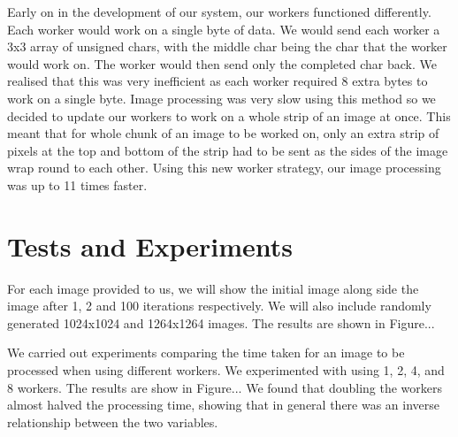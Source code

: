 \documentclass{article}
\begin{document}
\begin{multicols}{2}
\vspace{5mm}

Early on in the development of our system, our workers functioned differently. Each worker would work
on a single byte of data. We would send each worker a 3x3 array of unsigned chars, with the middle 
char being the char that the worker would work on. The worker would then send only the completed
char back. We realised that this was very inefficient as each worker required 8 extra bytes to work
on a single byte. Image processing was very slow using this method so we decided to update
our workers to work on a whole strip of an image at once. This meant that for whole chunk of an image
to be worked on, only an extra strip of pixels at the top and bottom of the strip had to be sent as
the sides of the image wrap round to each other. Using this new worker strategy, our image processing
was up to 11 times faster.

\section{Tests and Experiments}
For each image provided to us, we will show the initial image along side the image after 1, 2 and 100
iterations respectively. We will also include randomly generated 1024x1024 and 1264x1264 images. The
results are shown in Figure...

We carried out experiments comparing the time taken for an image to be processed when using different
workers. We experimented with using 1, 2, 4, and 8 workers. The results are show in Figure... We found
that doubling the workers almost halved the processing time, showing that in general there was an
inverse relationship between the two variables.

\end{multicols}

\newpage

\end{document}
